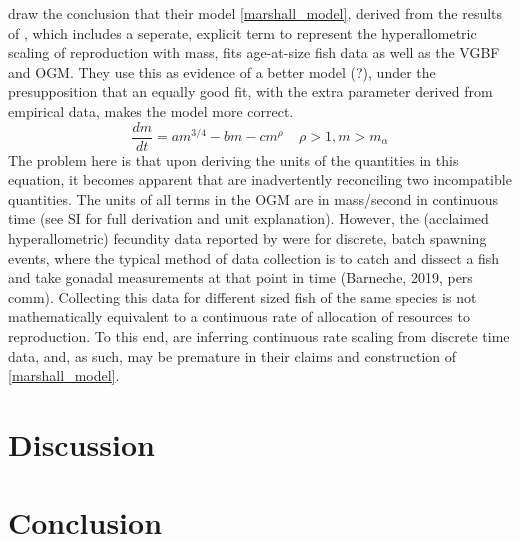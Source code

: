 \documentclass[a4paper]{article} %
\begin{document}
    \cite{Marshall2019b} draw the conclusion that their model \eqref{marshall_model}, derived from the results of \cite{Barneche2018d}, which includes a seperate, explicit term to represent the hyperallometric scaling of reproduction with mass, fits age-at-size fish data as well as the VGBF and \cite{West2001} OGM. They use this as evidence of a better model (?), under the presupposition that an equally good fit, with the extra parameter derived from empirical data, makes the model more correct. 
    \begin{equation}
        \frac{dm}{dt} = am^{3/4} - bm - cm^{\rho} \ \ \ \ \ \rho > 1, m > m_{\alpha} \label{marshall_model}
    \end{equation}
    The problem here is that upon deriving the units of the quantities in this equation, it becomes apparent that \cite{Marshall2019b} are inadvertently reconciling two incompatible quantities. The units of all terms in the OGM are in mass/second in continuous time (see SI for full derivation and unit explanation). However, the (acclaimed hyperallometric) fecundity data reported by \cite{Barneche2018d} were for discrete, batch spawning events, where the typical method of data collection is to catch and dissect a fish and take gonadal measurements at that point in time (Barneche, 2019, pers comm). Collecting this data for different sized fish of the same species is not mathematically equivalent to a continuous rate of allocation of resources to reproduction. To this end, \cite{Marshall2019b} are inferring continuous rate scaling from discrete time data, and, as such, may be premature in their claims and construction of \eqref{marshall_model}. 
\section{Discussion}\thispagestyle{empty}
\lipsum

\section{Conclusion}\thispagestyle{empty}
\lipsum

\newpage\let\mkbibnamefamily\textsc\printbibliography[title=Bibliography]\thispagestyle{empty} %

% 
\end{document}
